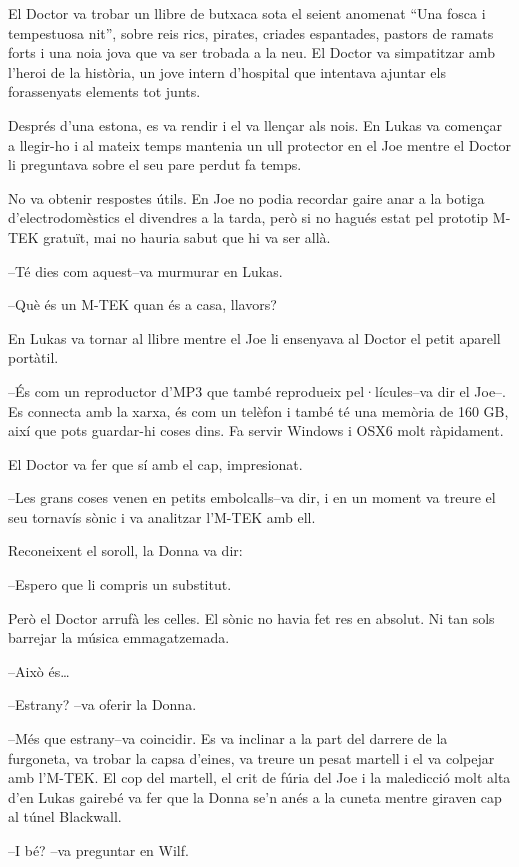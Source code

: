 El Doctor va trobar un llibre de butxaca sota el seient anomenat ``Una
fosca i tempestuosa nit'', sobre reis rics, pirates, criades espantades,
pastors de ramats forts i una noia jova que va ser trobada a la neu. El
Doctor va simpatitzar amb l'heroi de la història, un jove intern
d'hospital que intentava ajuntar els forassenyats elements tot junts.

Després d'una estona, es va rendir i el va llençar als nois. En Lukas va
començar a llegir-ho i al mateix temps mantenia un ull protector en el
Joe mentre el Doctor li preguntava sobre el seu pare perdut fa temps.

No va obtenir respostes útils. En Joe no podia recordar gaire anar a la
botiga d'electrodomèstics el divendres a la tarda, però si no hagués
estat pel prototip M-TEK gratuït, mai no hauria sabut que hi va ser
allà.

--Té dies com aquest--va murmurar en Lukas.

--Què és un M-TEK quan és a casa, llavors?

En Lukas va tornar al llibre mentre el Joe li ensenyava al Doctor el
petit aparell portàtil.

--És com un reproductor d'MP3 que també reprodueix pel·lícules--va dir
el Joe--. Es connecta amb la xarxa, és com un telèfon i també té una
memòria de 160 GB, així que pots guardar-hi coses dins. Fa servir
Windows i OSX6 molt ràpidament.

El Doctor va fer que sí amb el cap, impresionat.

--Les grans coses venen en petits embolcalls--va dir, i en un moment va
treure el seu tornavís sònic i va analitzar l'M-TEK amb ell.

Reconeixent el soroll, la Donna va dir:

--Espero que li compris un substitut.

Però el Doctor arrufà les celles. El sònic no havia fet res en absolut.
Ni tan sols barrejar la música emmagatzemada.

--Això és\ldots{}

--Estrany? --va oferir la Donna.

--Més que estrany--va coincidir. Es va inclinar a la part del darrere de
la furgoneta, va trobar la capsa d'eines, va treure un pesat martell i
el va colpejar amb l'M-TEK. El cop del martell, el crit de fúria del Joe
i la maledicció molt alta d'en Lukas gairebé va fer que la Donna se'n
anés a la cuneta mentre giraven cap al túnel Blackwall.

--I bé? --va preguntar en Wilf.

